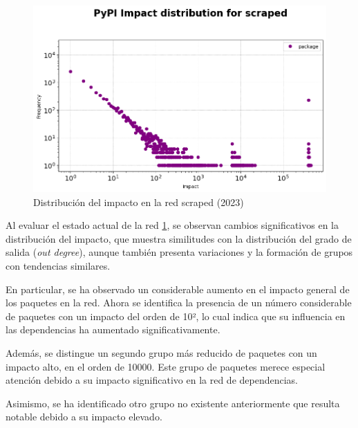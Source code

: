 \begin{figure}[ht!]
    \begin{center}
        \includegraphics[width=1\textwidth]{img/pypi/scraped_impact_distribution.png}
        \caption{Distribución del impacto en la red scraped (2023)}
        \label{fig:Distribución del impacto en la red scraped}
    \end{center}
\end{figure}

Al evaluar el estado actual de la red \ref{fig:Distribución del impacto en la red scraped}, se observan cambios significativos en la distribución del
impacto, que muestra similitudes con la distribución del grado de salida (\textit{out degree}),
aunque también presenta variaciones y la formación de grupos con tendencias similares.

En particular, se ha observado un considerable aumento en el impacto general de los paquetes en la
red. Ahora se identifica la presencia de un número considerable de paquetes con un impacto del orden
de 10², lo cual indica que su influencia en las dependencias ha aumentado
significativamente.

Además, se distingue un segundo grupo más reducido de paquetes con un impacto alto, en el orden de 10000.
Este grupo de paquetes merece especial atención debido a su impacto significativo
en la red de dependencias.

Asimismo, se ha identificado otro grupo no existente anteriormente que resulta notable debido a
su impacto elevado.

